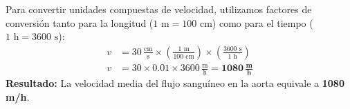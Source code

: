 \documentclass[12pt]{article}
\begin{document}
\begin{tcolorbox}
\begin{center}
\begin{tikzpicture}[scale=0.95]
    \end{tikzpicture}
    \end{center}

    \vspace{0.4cm}
    \begin{tcolorbox}[colback=medteal!10, colframe=medteal, arc=2mm, boxrule=1.2pt, title=\textbf{Desarrollo Matemático y Solución}]
        Para convertir unidades compuestas de velocidad, utilizamos factores de conversión tanto para la longitud ($1 \text{ m} = 100 \text{ cm}$) como para el tiempo ($1 \text{ h} = 3600 \text{ s}$):
        \begin{align*}
            v &= 30 \, \frac{\text{cm}}{\text{s}} \times \left( \frac{1 \text{ m}}{100 \text{ cm}} \right) \times \left( \frac{3600 \text{ s}}{1 \text{ h}} \right) \\[1.5ex]
            v &= 30 \times 0.01 \times 3600 \, \frac{\text{m}}{\text{h}} = \mathbf{1080 \, \frac{\text{m}}{\text{h}}}
        \end{align*}
        \textbf{Resultado:} La velocidad media del flujo sanguíneo en la aorta equivale a \textbf{1080 m/h}.
    \end{tcolorbox}
    
\end{tcolorbox}
\end{document}
